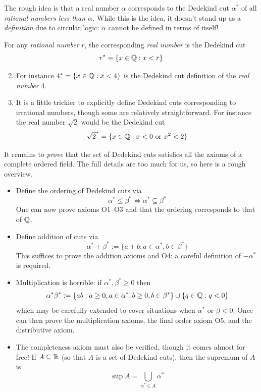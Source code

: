 The rough idea is that a real number $\alpha$ corresponds to the Dedekind cut $\alpha^*$ of all \emph{rational numbers less than $\alpha$.} While this is the idea, it doesn't stand up as a \emph{definition} due to circular logic: $\alpha$ cannot be defined in terms of itself! 

\begin{examples}{}{}
	\exstart For any \emph{rational number} $r$, the corresponding \emph{real number} is the Dedekind cut
	\[r^*=\{x\in\mathbb{Q}:x<r\}\]
	\begin{enumerate}\setcounter{enumi}{1}
	  \item[]For instance $4^*=\{x\in\mathbb{Q}:x<4\}$ is the Dedekind cut definition of the  \emph{real number} 4.
	  \item It is a little trickier to explicitly define Dedekind cuts corresponding to irrational numbers, though some are relatively straightforward. For instance the real number $\sqrt 2$ would be the Dedekind cut
		\[\sqrt 2^*=\{x\in\mathbb{Q}:x<0\text{ or }x^2<2\}\]
	\end{enumerate}
\end{examples}

It remains to \emph{prove} that the set of Dedekind cuts satisfies all the axioms of a complete ordered field. The full details are too much for us, so here is a rough overview.
\begin{itemize}
  \item Define the ordering of Dedekind cuts via
	\[\alpha^*\le\beta^*\iff\alpha^*\subseteq\beta^*\]
	One can now prove axioms O1--O3 and that the ordering corresponds to that of $\mathbb{Q}$.
	\item Define addition of cuts via
	\[\alpha^*+\beta^*:=\{a+b:a\in\alpha^*,b\in\beta^*\}\]
	This suffices to prove the addition axioms and O4: a careful definition of $-\alpha^*$ is required.
	\item Multiplication is horrible: if $\alpha^*,\beta^*\ge 0$ then
	\[\alpha^*\beta^*:=\{ab:a\ge 0,a\in \alpha^*,b\ge 0,b\in \beta^*\}\cup\{q\in\mathbb{Q}:q<0\}\]
	which may be carefully extended to cover situations when $\alpha^*$ or $\beta<0$. Once can then prove the multiplication axioms, the final order axiom O5, and the distributive axiom.
	\item The completeness axiom must also be verified, though it comes almost for free! If $A\subseteq\mathbb{R}$ (so that $A$ is a set of Dedekind cuts), then the supremum of $A$ is
	\[\sup A=\bigcup\limits_{\alpha^*\in A}\alpha^*\]
\end{itemize}

